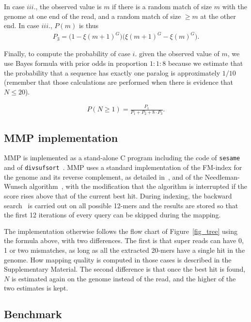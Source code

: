 \documentclass[a4,center,fleqn]{NAR}
\begin{document}
In case $iii.$, the observed value is $m$ if there is a random match of
size $m$ with the genome at one end of the read, and a random match of
size $\geq m$ at the other end. In case $iii.$, $P(m)$ is thus
\begin{align*}
P_3 = \big(1-\xi(m+1)^G\big) \big(\xi(m+1)^G - \xi(m)^G\big).
\end{align*}

Finally, to compute the probability of case $i.$ given the observed value
of $m$, we use Bayes formula with prior odds in proportion $1:1:8$ because
we estimate that the probability that a sequence has exactly one paralog
is approximately $1/10$ (remember that those calculations are performed
when there is evidence that $N \leq 20$).

\begin{align*}
P(N \geq 1) = \frac{P_1}{P_1 + P_2 + 8\cdot P_3}.
\end{align*}


\subsection{MMP implementation}

MMP is implemented as a stand-alone C program including the code of
\texttt{sesame}~\cite{Filion619155} and of
\texttt{divsufsort}~\cite{fischer2017dismantling}. MMP uses a standard
implementation of the FM-index for the genome and its reverse complement,
as detailed in~\cite{blog}, and of the Needleman-Wunsch
algorithm~\cite{pmid5420325}, with the modification that the algorithm is
interrupted if the score rises above that of the current best hit. During
indexing, the backward search~\cite{ferragina2000opportunistic} is carried
out on all possible 12-mers and the results are stored so that the first
12 iterations of every query can be skipped during the mapping.

The implementation otherwise follows the flow chart of
Figure~\ref{fig_tree} using the formula above, with two differences.
The first is that super reads can have 0, 1 or two mismatches, as long as
all the extracted 20-mers have a single hit in the genome. How mapping
quality is computed in those cases is described in the Supplementary
Material. The second difference is that once the best hit is found, $N$ is
estimated again on the genome instead of the read, and the higher of the
two estimates is kept.

\subsection{Benchmark}
\end{document}
